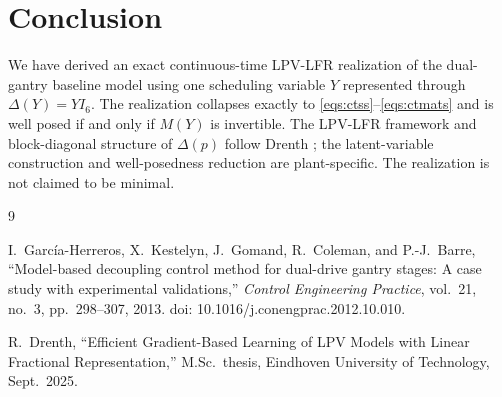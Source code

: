 \documentclass[11pt]{article}
\begin{document}
\section{Conclusion}
We have derived an exact continuous-time LPV-LFR realization of the dual-gantry
baseline model using one scheduling variable $Y$ represented through
$\Delta(Y) = YI_6$. The realization collapses exactly to \eqref{eqs:ctss}--\eqref{eqs:ctmats}
and is well posed if and only if $M(Y)$ is invertible. The LPV-LFR framework
and block-diagonal structure of $\Delta(p)$ follow Drenth \cite{drenth2025thesis};
the latent-variable construction and well-posedness reduction are plant-specific.
The realization is not claimed to be minimal.

\newpage
\begin{thebibliography}{9}

I.~Garc{\'i}a-Herreros, X.~Kestelyn, J.~Gomand, R.~Coleman, and P.-J.~Barre,
``Model-based decoupling control method for dual-drive gantry stages:
A case study with experimental validations,''
\textit{Control Engineering Practice}, vol.~21, no.~3, pp.~298--307, 2013.
doi: 10.1016/j.conengprac.2012.10.010.

R.~Drenth,
``Efficient Gradient-Based Learning of {LPV} Models with Linear Fractional Representation,''
M.Sc.\ thesis, Eindhoven University of Technology, Sept.\ 2025.

\end{thebibliography}
\end{document}
